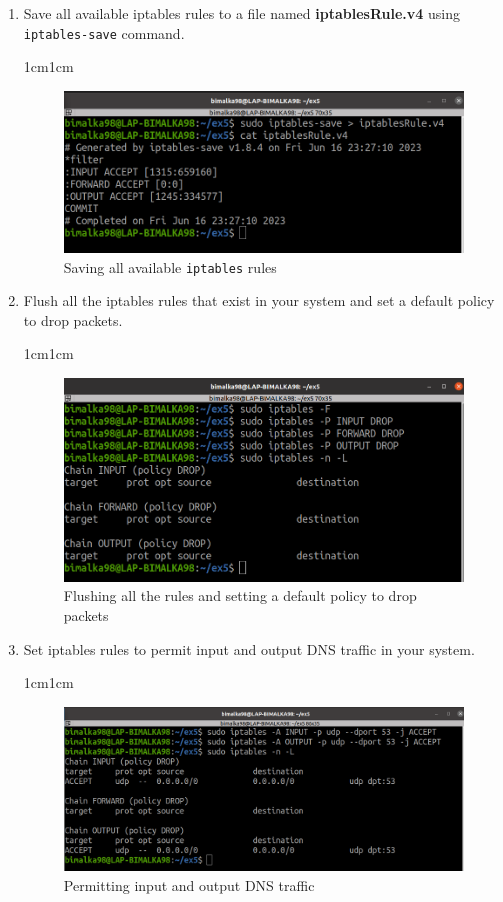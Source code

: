 \documentclass[11pt,letterpaper]{article}
\newenvironment{answer}{\em \color{blue} \begin{adjustwidth}{1cm}{1cm}}{\end{adjustwidth}}
\begin{document}
\begin{enumerate}
		\item Save all available iptables rules to a file named \textbf{iptablesRule.v4} using \texttt{iptables-save} command.
		
		\begin{answer}
			\begin{figure}[H]
				\centering
				\includegraphics[width=0.65\columnwidth]{images/part1/4.png}
				\caption{Saving all available {\tt iptables} rules}
			\end{figure}
		\end{answer}
		
		\item Flush all the iptables rules that exist in your system and set a default policy to drop packets.
		\begin{answer}
			\begin{figure}[H]
				\centering
				\includegraphics[width=0.65\columnwidth]{images/part1/5.png}
				\caption{Flushing all the rules and setting a default policy to drop packets}
			\end{figure}
		\end{answer}
		
		\item Set iptables rules to permit input and output DNS traffic in your system.
		
		\begin{answer}
			\begin{figure}[H]
				\centering
				\includegraphics[width=0.65\columnwidth]{images/part1/6.png}
				\caption{Permitting input and output DNS traffic}
			\end{figure}
		\end{answer}
		

\end{enumerate}
\end{document}
